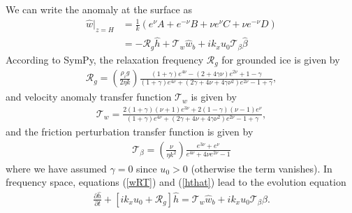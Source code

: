 \documentclass[paper=a4, fontsize=11pt]{article}
\begin{document}
We can write the anomaly at the surface as
\begin{align}
\widehat{w}|_{z=H} &= \frac{1}{k}\left(e^{\nu} A + { e^{-\nu}}B + \nu e^{\nu} C + {\nu}{ e^{-\nu}} D\right) \\
&= -\mathcal{R}_g\widehat{h} + \mathcal{T}_w\widehat{w}_b  +ik_x u_0  \mathcal{T}_{\beta}  \widehat{\beta}\label{wRT}
\end{align}
According to SymPy, the relaxation frequency $\mathcal{R}_g$ for grounded ice is given by
\begin{align}
\mathcal{R}_g = \left(\frac{\rho_i g }{2\eta k}\right)\frac{ (1+\gamma)e^{4\nu} -(2+4\gamma\nu)e^{2\nu} +1-\gamma  }{ (1+\gamma)e^{4\nu} + (2\gamma+4\nu+4\gamma\nu^2)e^{2\nu} -1 + \gamma  },
\end{align}
and velocity anomaly transfer function $\mathcal{T}_w$ is given by
\begin{align}
\mathcal{T}_w = \frac{2(1+\gamma)(\nu+1)e^{3\nu}+2(1-\gamma)(\nu-1)e^{\nu}  }{(1+\gamma)e^{4\nu} + (2\gamma+4\nu+4\gamma\nu^2)e^{2\nu} -1 + \gamma },
\end{align}
and the friction perturbation transfer function is given by
\begin{align}
\mathcal{T}_{\beta} =  \left(\frac{\nu}{\eta k^2}\right) \frac{e^{3\nu} + e^{\nu}}{e^{4\nu} +4\nu e^{2\nu} -1 }
\end{align}
where we have assumed $\gamma=0$  since $u_0>0$ (otherwise the term vanishes).
In frequency space,
equations (\ref{wRT}) and (\ref{hthat}) lead to the evolution equation
\begin{align}
\frac{\partial \widehat{h}}{\partial t}+ \left[ik_xu_0  + \mathcal{R}_g\right]\widehat{h} = \mathcal{T}_w\widehat{w}_b+ik_xu_0\mathcal{T}_{\beta} \widehat{\beta}. \label{dhhat}
\end{align}
\end{document}
